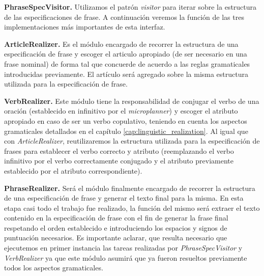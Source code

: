 \bigskip
\noindent
\textbf{PhraseSpecVisitor.} Utilizamos el patrón \textit{visitor} \cite{gof} para iterar sobre la estructura de las especificaciones de frase. A continuación veremos la función de las tres implementaciones más importantes de esta interfaz. 

\bigskip
\noindent
\textbf{ArticleRealizer.} Es el módulo encargado de recorrer la estructura de una especificación de frase y escoger el articulo apropiado (de ser necesario en una frase nominal) de forma tal que concuerde de acuerdo a las reglas gramaticales introducidas previamente. El artículo será agregado sobre la misma estructura utilizada para la especificación de frase.

\bigskip
\noindent
\textbf{VerbRealizer.} Este módulo tiene la responsabilidad de conjugar el verbo de una oración (establecido en infinitivo por el \textit{microplanner}) y escoger el atributo apropiado en caso de ser un verbo copulativo, teniendo en cuenta los aspectos gramaticales detallados en el capítulo \ref{cap:linguistic_realization}. Al igual que con \textit{ArticleRealizer}, reutilizaremos la estructura utilizada para la especificación de frases para establecer el verbo correcto y atributo (reemplazando el verbo infinitivo por el verbo correctamente conjugado y el atributo previamente establecido por el atributo correspondiente).

\bigskip
\noindent
\textbf{PhraseRealizer.} Será el módulo finalmente encargado de recorrer la estructura de una especificación de frase y generar el texto final para la misma. En esta etapa casi todo el trabajo fue realizado, la función del mismo será extraer el texto contenido en la especificación de frase con el fin de generar la frase final respetando el orden establecido e introduciendo los espacios y signos de puntuación necesarios. Es importante aclarar, que resulta necesario que ejecutemos en primer instancia las tareas realizadas por \textit{PhraseSpecVisitor} y \textit{VerbRealizer} ya que este módulo asumirá que ya fueron resueltos previamente todos los aspectos gramaticales.